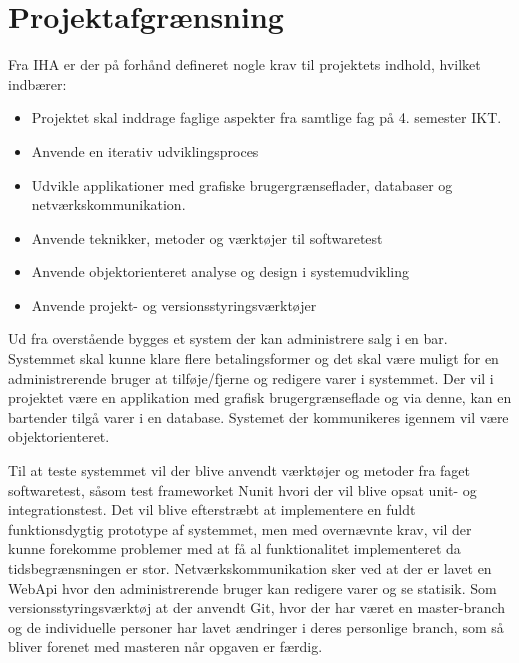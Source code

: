 \chapter{Projektafgrænsning}
Fra IHA  er der på forhånd defineret nogle krav til projektets indhold, hvilket indbærer:
\begin{itemize}
\item Projektet skal inddrage faglige aspekter fra samtlige fag på 4. semester IKT. 
\item Anvende en iterativ udviklingsproces
\item Udvikle applikationer med grafiske brugergrænseflader, databaser og
netværkskommunikation.
\item Anvende teknikker, metoder og værktøjer til softwaretest
\item Anvende objektorienteret analyse og design i systemudvikling
\item Anvende projekt- og versionsstyringsværktøjer
\newline\newline
\end{itemize}

Ud fra overstående bygges et system der kan administrere salg i en bar. Systemmet skal kunne klare flere betalingsformer og det skal være muligt for en administrerende bruger at tilføje/fjerne og redigere varer i systemmet.  
\newline\newline
Der vil i projektet være en applikation med grafisk brugergrænseflade og via denne, kan en bartender tilgå varer i en database. Systemet der kommunikeres igennem vil være objektorienteret. 

Til at teste systemmet vil der blive anvendt værktøjer og metoder fra faget softwaretest, såsom test frameworket Nunit hvori der vil blive opsat unit- og integrationstest. 
\newline\newline
Det vil blive efterstræbt at implementere en fuldt funktionsdygtig prototype af systemmet, men med overnævnte krav, vil der kunne forekomme problemer med at få al funktionalitet implementeret da tidsbegrænsningen er stor. 
\newline\newline
Netværkskommunikation sker ved at der er lavet en WebApi hvor den administrerende bruger kan redigere varer og se statisik.  
\newline\newline
Som versionsstyringsværktøj at der anvendt Git, hvor der har været en master-branch og de individuelle personer har lavet ændringer i deres personlige branch, som så bliver forenet med masteren når opgaven er færdig.  
